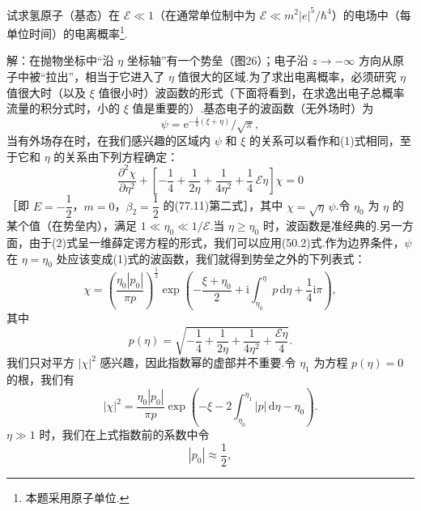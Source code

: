 \begin{xiti}

\quad 试求氢原子（基态）在 $\mathcal{E}\ll1$（在通常单位制中为 $\mathcal{E}\ll m^{2}|e|^{5}/\hbar^{4}$）的电场中（每单位时间）的电离概率\footnote{本题采用原子单位.}.

解：在抛物坐标中“沿 $\eta$ 坐标轴”有一个势垒（图26）；电子沿 $z\rightarrow-\infty$ 方向从原子中被“拉出”，相当于它进入了 $\eta$ 值很大的区域.为了求出电离概率，必须研究 $\eta$ 值很大时（以及 $\xi$ 值很小时）波函数的形式（下面将看到，在求逸出电子总概率流量的积分式时，小的 $\xi$ 值是重要的）.基态电子的波函数（无外场时）为
\setcounter{equation}{0}\renewcommand{\theequation}{\arabic{equation}}%
\begin{equation}
  \psi=\mathrm{e}^{-\frac{1}{2}(\xi+\eta)}/\sqrt{\pi},
\end{equation}
当有外场存在时，在我们感兴趣的区域内 $\psi$ 和 $\xi$ 的关系可以看作和(1)式相同，至于它和 $\eta$ 的关系由下列方程确定：
\begin{equation}
  \frac{\partial^{2}\chi}{\partial\eta^{2}}
  +\left[-\frac{1}{4}+\frac{1}{2\eta}+\frac{1}{4\eta^{2}}+\frac{1}{4}\,\mathcal{E}\eta\right]\chi=0
\end{equation}
［即 $E=-\dfrac{1}{2}$，$m=0$，$\beta_2=\dfrac{1}{2}$ 的(77.11)第二式］，其中 $\chi=\sqrt{\eta}\,\psi$.令 $\eta_0$ 为 $\eta$ 的某个值（在势垒内），满足 $1\ll\eta_0\ll1/\mathcal{E}$.当 $\eta\geqslant\eta_0$ 时，波函数是准经典的.另一方面，由于(2)式呈一维薛定谔方程的形式，我们可以应用(50.2)式.作为边界条件，$\psi$ 在 $\eta=\eta_0$ 处应该变成(1)式的波函数，我们就得到势垒之外的下列表式：
\begin{equation*}
  \chi=\left(\frac{\eta_0|p_0|}{\pi p}\right)^{\frac{1}{2}}
  \exp\left(-\frac{\xi+\eta_0}{2}
  +\mathrm{i}\int_{\eta_0}^{\eta}p\,\mathrm{d}\eta+\frac{1}{4}\mathrm{i}\pi\right),
\end{equation*}
其中
\begin{equation*}
  p(\eta)=\sqrt{-\frac{1}{4}+\frac{1}{2\eta}+\frac{1}{4\eta^{2}}+\frac{\mathcal{E}\eta}{4}}.
\end{equation*}
我们只对平方 $|\chi|^{2}$ 感兴趣，因此指数幂的虚部并不重要.令 $\eta_1$ 为方程 $p(\eta)=0$ 的根，我们有
\begin{equation}
  |\chi|^{2}=\frac{\eta_0|p_0|}{\pi p}
  \exp\left(-\xi-2\int_{\eta_0}^{\eta_1}|p|\,\mathrm{d}\eta-\eta_0\right).
\end{equation}
$\eta\gg1$ 时，我们在上式指数前的系数中令
\begin{equation*}
  |p_0|\approx\frac{1}{2},

\end{equation*}
\end{xiti}
